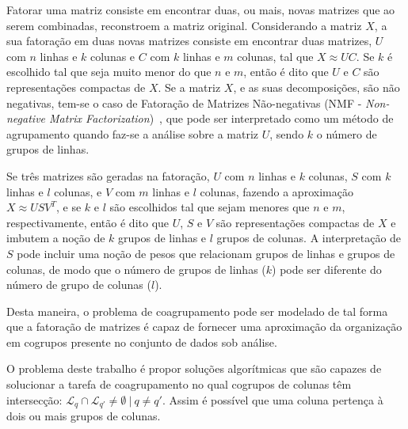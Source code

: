 \documentclass[
    12pt,                %
    oneside,            %
    a4paper,            %
    english,            %
    brazil                %
    ]{abntex2ppgsi}
\begin{document}
Fatorar uma matriz consiste em encontrar duas, ou mais, novas matrizes que ao serem combinadas, reconstroem a matriz original.
Considerando a matriz $X$, a sua fatoração em duas novas matrizes consiste em encontrar duas matrizes, $U$ com $n$ linhas e $k$ colunas e $C$ com $k$ linhas e $m$ colunas, tal que $X \approx UC$.
Se $k$ é escolhido tal que seja muito menor do que $n$ e $m$, então é dito que $U$ e $C$ são representações compactas de $X$.
Se a matriz $X$, e as suas decomposições, são não negativas, tem-se o caso de Fatoração de Matrizes Não-negativas (NMF - \textit{Non-negative Matrix Factorization})~\cite{lee:nnmf00}, que pode ser interpretado como um método de agrupamento quando faz-se a análise sobre a matriz $U$, sendo $k$ o número de grupos de linhas.

Se três matrizes são geradas na fatoração, $U$ com $n$ linhas e $k$ colunas, $S$ com $k$ linhas e $l$ colunas, e $V$ com $m$ linhas e $l$ colunas, fazendo a aproximação $X \approx USV^T$, e se $k$ e $l$ são escolhidos tal que sejam menores que $n$ e $m$, respectivamente, então é dito que $U$, $S$ e $V$ são representações compactas de $X$ e imbutem a noção de $k$ grupos de linhas e $l$ grupos de colunas.
A interpretação de $S$ pode incluir uma noção de pesos que relacionam grupos de linhas e grupos de colunas, de modo que o número de grupos de linhas ($k$) pode ser diferente do número de grupo de colunas ($l$).

Desta maneira, o problema de coagrupamento pode ser modelado de tal forma que a fatoração de matrizes é capaz de fornecer uma aproximação da organização em cogrupos presente no conjunto de dados sob análise.

O problema deste trabalho é propor soluções algorítmicas que são capazes de solucionar a tarefa de coagrupamento no qual cogrupos de colunas têm intersecção: $\mathcal{L}_q \cap \mathcal{L}_{q'} \neq \emptyset~|~q \neq q'$.
Assim é possível que uma coluna pertença à dois ou mais grupos de colunas.



\end{document}
